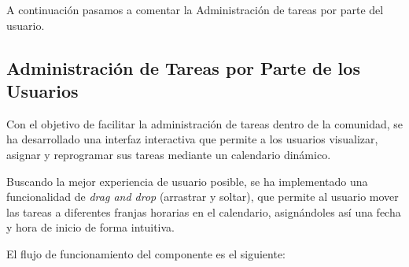 A continuación pasamos a comentar la Administración de tareas por parte del usuario.
\vspace{0.5em}
\subsection{Administración de Tareas por Parte de los Usuarios}

Con el objetivo de facilitar la administración de tareas dentro de la comunidad, se ha desarrollado una interfaz interactiva que permite a los usuarios visualizar, asignar y reprogramar sus tareas mediante un calendario dinámico.

Buscando la mejor experiencia de usuario posible, se ha implementado una funcionalidad de \textit{drag and drop} (arrastrar y soltar), que permite al usuario mover las tareas a diferentes franjas horarias en el calendario, asignándoles así una fecha y hora de inicio de forma intuitiva.

El flujo de funcionamiento del componente es el siguiente:

